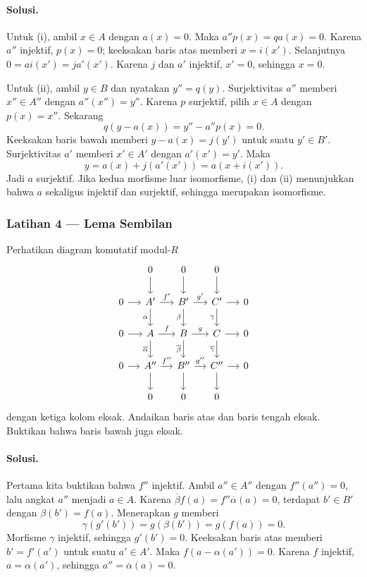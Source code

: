 \paragraph{Solusi.}
\hypertarget{o014.mastery.diagram-chasing.001.sol03}{ }
Untuk (i), ambil $x\in A$ dengan $a(x)=0$. Maka
$a''p(x)=qa(x)=0$. Karena $a''$ injektif, $p(x)=0$; keeksakan baris atas
memberi $x=i(x')$. Selanjutnya
$0=a i(x')=j a'(x')$. Karena $j$ dan $a'$ injektif, $x'=0$, sehingga
$x=0$.

Untuk (ii), ambil $y\in B$ dan nyatakan $y''=q(y)$. Surjektivitas $a''$
memberi $x''\in A''$ dengan $a''(x'')=y''$. Karena $p$ surjektif, pilih
$x\in A$ dengan $p(x)=x''$. Sekarang
\[
	q(y-a(x))=y''-a''p(x)=0.
\]
Keeksakan baris bawah memberi $y-a(x)=j(y')$ untuk suatu $y'\in B'$.
Surjektivitas $a'$ memberi $x'\in A'$ dengan $a'(x')=y'$. Maka
\[
	y=a(x)+j(a'(x'))=a(x+i(x')).
\]
Jadi $a$ surjektif. Jika kedua morfisme luar isomorfisme, (i) dan (ii)
menunjukkan bahwa $a$ sekaligus injektif dan surjektif, sehingga merupakan
isomorfisme.

\subsubsection*{Latihan 4 --- Lema Sembilan}
\hypertarget{o014.mastery.diagram-chasing.001.ex04}{ }
\label{mastery:diagram-chasing-001-ex04}

Perhatikan diagram komutatif modul-$R$
\[
\begin{tikzcd}[column sep=small]
	& 0 \arrow[d] & 0 \arrow[d] & 0 \arrow[d] & \\
	0 \arrow[r] & A' \arrow[r, "f'"] \arrow[d, "\alpha"'] & B' \arrow[r, "g'"] \arrow[d, "\beta"'] & C' \arrow[r] \arrow[d, "\gamma"'] & 0 \\
	0 \arrow[r] & A \arrow[r, "f"] \arrow[d, "\overline\alpha"'] & B \arrow[r, "g"] \arrow[d, "\overline\beta"'] & C \arrow[r] \arrow[d, "\overline\gamma"'] & 0 \\
	0 \arrow[r] & A'' \arrow[r, "f''"] \arrow[d] & B'' \arrow[r, "g''"] \arrow[d] & C'' \arrow[r] \arrow[d] & 0 \\
	& 0 & 0 & 0 &
\end{tikzcd}
\]
dengan ketiga kolom eksak. Andaikan baris atas dan baris tengah eksak.
Buktikan bahwa baris bawah juga eksak.

\paragraph{Solusi.}
\hypertarget{o014.mastery.diagram-chasing.001.sol04}{ }
Pertama kita buktikan bahwa $f''$ injektif. Ambil $a''\in A''$ dengan
$f''(a'')=0$, lalu angkat $a''$ menjadi $a\in A$. Karena
$\overline\beta f(a)=f''\overline\alpha(a)=0$, terdapat $b'\in B'$ dengan
$\beta(b')=f(a)$. Menerapkan $g$ memberi
\[
	\gamma(g'(b'))=g(\beta(b'))=g(f(a))=0.
\]
Morfisme $\gamma$ injektif, sehingga $g'(b')=0$. Keeksakan baris atas
memberi $b'=f'(a')$ untuk suatu $a'\in A'$. Maka
$f(a-\alpha(a'))=0$. Karena $f$ injektif, $a=\alpha(a')$, sehingga
$a''=\overline\alpha(a)=0$.

